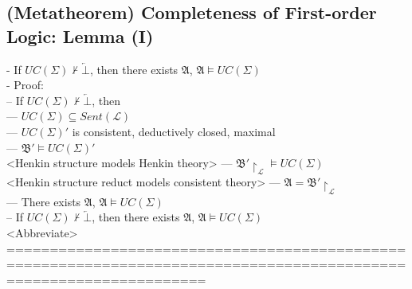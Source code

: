 \documentclass{book}
\newcommand{\inot}{\not}
\newcommand{\contr}{\overleftarrow{\bot}}
\begin{document}
\subsection{(Metatheorem) Completeness of First-order Logic: Lemma (I)}
	- If $UC(\Sigma) \inot \vdash \contr$, then there exists $\mathfrak{A}$, $\mathfrak{A} \vDash UC(\Sigma)$ \\
	- Proof: \\
		-- If $UC(\Sigma) \inot \vdash \contr$, then \\
			--- $UC(\Sigma) \subseteq Sent(\mathcal{L})$ \\
			--- $UC(\Sigma)'$ is consistent, deductively closed, maximal \\
			--- $\mathfrak{B}' \vDash UC(\Sigma)'$ \\ <Henkin structure models Henkin theory>
			--- $\mathfrak{B}' \upharpoonright_\mathcal{L} \vDash UC(\Sigma)$ \\ <Henkin structure reduct models consistent theory>
			--- $\mathfrak{A} = \mathfrak{B}' \upharpoonright_\mathcal{L}$ \\
			--- There exists $\mathfrak{A}$, $ \mathfrak{A} \vDash UC(\Sigma)$ \\
		-- If $UC(\Sigma) \inot \vdash \contr$, then there exists $\mathfrak{A}$, $\mathfrak{A} \vDash UC(\Sigma)$ \\ <Abbreviate>
	===================================================================================================================
\end{document}
